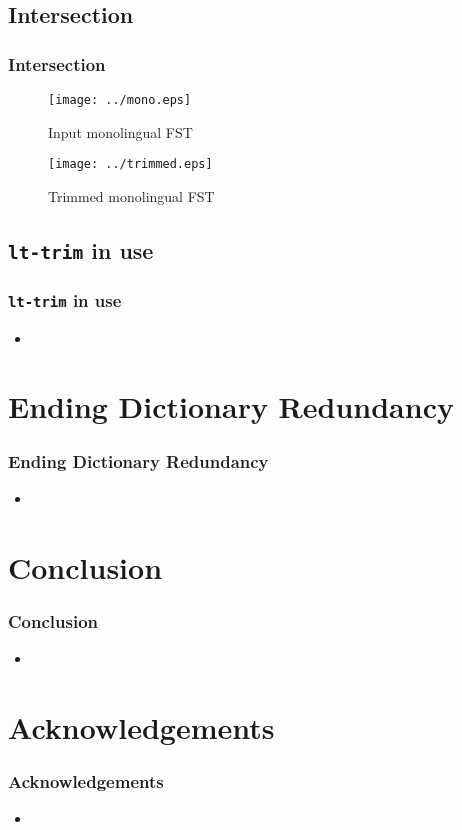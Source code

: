 \documentclass[notes=hide]{beamer}
\newcommand{\tool}[1]{\texttt{#1}}
\begin{document}
\subsection{Intersection}
\begin{frame}
  \frametitle{Intersection}
  \begin{figure}[h]
    \begin{center}
      \texttt{[image: ../mono.eps]}
      \caption{Input monolingual FST}
      \label{fig:mono}
    \end{center}
  \end{figure}

  \begin{figure}[h]
    \begin{center}
      \texttt{[image: ../trimmed.eps]}
      \caption{Trimmed monolingual FST}
      \label{fig:trimmed}
    \end{center}
  \end{figure}

\end{frame}

\subsection{\tool{lt-trim} in use}
\begin{frame}
  \frametitle{\tool{lt-trim} in use}
  \begin{itemize}
  \item
  \end{itemize}
\end{frame}

\section{Ending Dictionary Redundancy}
\begin{frame}
  \frametitle{Ending Dictionary Redundancy}
  \begin{itemize}
  \item
  \end{itemize}
\end{frame}

\section{Conclusion}
\begin{frame}
  \frametitle{Conclusion}
  \begin{itemize}
  \item
  \end{itemize}
\end{frame}

\section*{Acknowledgements}
\begin{frame}
  \frametitle{Acknowledgements}
  \begin{itemize}
  \item
  \end{itemize}
\end{frame}
\end{document}
